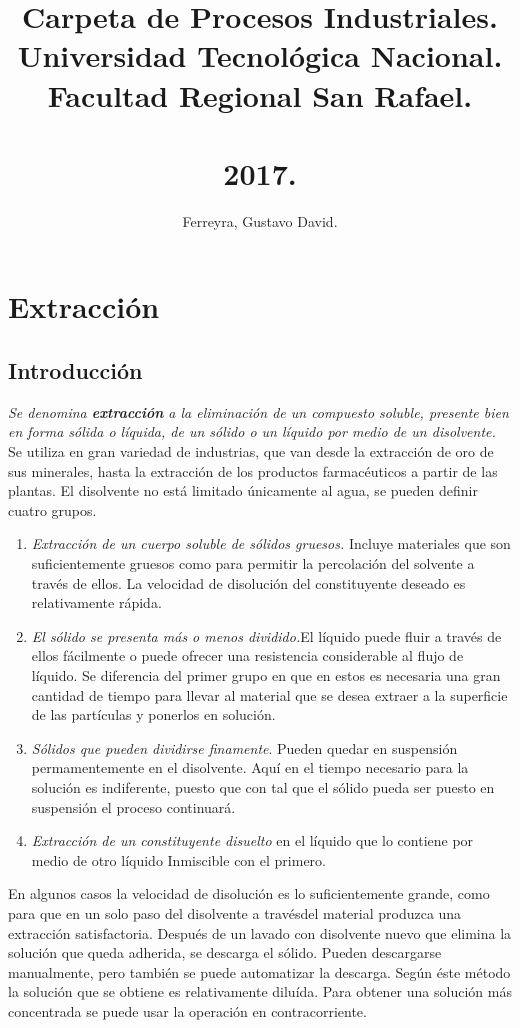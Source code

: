 \documentclass[12pt,openany]{book}
\title{Carpeta de Procesos Industriales.\\ Universidad Tecnológica Nacional.\\ Facultad Regional San Rafael.\\ \\ 2017.}
\author{Ferreyra, Gustavo David.}
\begin{document}
\maketitle
\tableofcontents 
\chapter {Extracción}
\section{Introducción}

\textit{Se denomina\textbf{ extracción} a la eliminación de un compuesto soluble,
presente bien en forma sólida o líquida, de un sólido o un líquido 
 por medio de un disolvente.}  Se utiliza en gran variedad de industrias,
 que van desde la extracción de oro de sus minerales, hasta la extracción de los productos 
 farmacéuticos a partir de las plantas. El disolvente no está limitado únicamente al agua, se pueden definir
 cuatro grupos.

 \begin{enumerate}
    \item \textit{Extracción de un cuerpo soluble de sólidos gruesos.} Incluye materiales que son
    suficientemente gruesos como para permitir la percolación del solvente a través de ellos. La velocidad de 
    disolución del constituyente deseado es relativamente rápida.
    \item \textit{El sólido se presenta más o menos dividido.}El líquido puede fluir a través de ellos
    fácilmente o puede ofrecer una resistencia considerable al flujo de
    líquido. Se diferencia del primer grupo en que en estos es necesaria una gran cantidad de 
    tiempo para llevar al material que se desea extraer a la superficie de las
    partículas y ponerlos en solución.
    \item \textit{Sólidos que pueden dividirse finamente}. Pueden quedar en suspensión
    permamentemente en el disolvente. Aquí en el tiempo necesario
    para la solución es indiferente, puesto que con tal que el sólido
    pueda ser puesto en suspensión el proceso continuará.
    \item \textit{Extracción de un constituyente disuelto} en el líquido que lo contiene por medio
    de otro líquido Inmiscible con el primero. 
\end{enumerate}

En algunos casos la velocidad de disolución es lo suficientemente grande, como para que en un 
solo paso del disolvente a travésdel material produzca una extracción satisfactoria. Después
de un lavado con disolvente nuevo que elimina la solución que queda adherida, se descarga el sólido. Pueden
descargarse manualmente, pero también se puede automatizar la descarga. Según éste método
la solución que se obtiene es relativamente diluída. Para obtener una solución más concentrada se puede
usar la operación en contracorriente.
\end{document}
